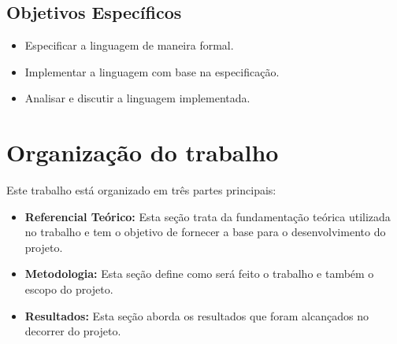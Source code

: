 \subsection{Objetivos Específicos}

\begin{itemize}
    \item Especificar a linguagem de maneira formal.
    \item Implementar a linguagem com base na especificação.
    \item Analisar e discutir a linguagem implementada.
\end{itemize}

\section{Organização do trabalho}

Este trabalho está organizado em três partes principais:

\begin{itemize}
    \item \textbf{Referencial Teórico:} Esta seção trata da fundamentação teórica
    utilizada no trabalho e tem o objetivo de fornecer a base para o desenvolvimento 
    do projeto.
    \item \textbf{Metodologia:} Esta seção define como será feito o trabalho e também
    o escopo do projeto.
    \item \textbf{Resultados:} Esta seção aborda os resultados que foram alcançados no decorrer
    do projeto.
\end{itemize}